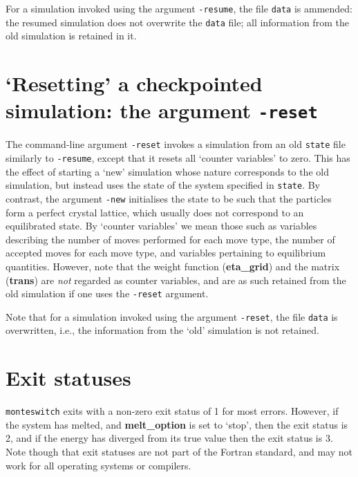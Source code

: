 \documentclass{report}
\begin{document}
For a simulation invoked using the argument \texttt{-resume}, the file \texttt{data} is ammended: the resumed simulation does not overwrite the
\texttt{data} file; all information from the old simulation is retained in it.

\section{`Resetting' a checkpointed simulation: the argument \texttt{-reset}}\label{sec:reset}
The command-line argument \texttt{-reset} invokes a simulation from an old \texttt{state} file similarly to \texttt{-resume}, except that it
resets all `counter variables' to zero. This has the effect of starting a `new' simulation whose nature corresponds to the old simulation, 
but instead uses the state of the system specified in \texttt{state}. By contrast, the argument \texttt{-new} initialises the 
state to be such that the particles form a perfect crystal lattice, which usually does not correspond to an equilibrated state.
By `counter variables' we mean those such as variables describing the number of moves performed for each move type, the number of accepted moves 
for each move type, and variables pertaining to equilibrium quantities. However, note that the weight function (\textbf{eta\_grid}) and the
matrix (\textbf{trans}) are \emph{not} regarded as counter variables, and are as such retained from the old simulation
if one uses the \texttt{-reset} argument.

Note that for a simulation invoked using the argument \texttt{-reset}, the file \texttt{data} is overwritten, i.e., the information from the `old'
simulation is not retained.


\section{Exit statuses}
\texttt{monteswitch} exits with a non-zero exit status of 1 for most errors. However, if the system has melted, and \textbf{melt\_option} is set to
`stop', then the exit status is 2, and if the energy has diverged from its true value then the exit status is 3. 
Note though that exit statuses are not part of the Fortran standard, and may not work for all operating systems or compilers. 
\end{document}
